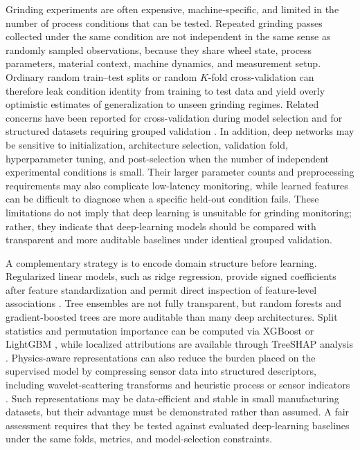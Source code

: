 Grinding experiments are often expensive, machine-specific, and limited in the number of process conditions that can be tested. Repeated grinding passes collected under the same condition are not independent in the same sense as randomly sampled observations, because they share wheel state, process parameters, material context, machine dynamics, and measurement setup. Ordinary random train--test splits or random \(K\)-fold cross-validation can therefore leak condition identity from training to test data and yield overly optimistic estimates of generalization to unseen grinding regimes. Related concerns have been reported for cross-validation during model selection \cite{varma2006bias} and for structured datasets requiring grouped validation \cite{Roberts2017}. In addition, deep networks may be sensitive to initialization, architecture selection, validation fold, hyperparameter tuning, and post-selection when the number of independent experimental conditions is small. Their larger parameter counts and preprocessing requirements may also complicate low-latency monitoring, while learned features can be difficult to diagnose when a specific held-out condition fails. These limitations do not imply that deep learning is unsuitable for grinding monitoring; rather, they indicate that deep-learning models should be compared with transparent and more auditable baselines under identical grouped validation.

A complementary strategy is to encode domain structure before learning. Regularized linear models, such as ridge regression, provide signed coefficients after feature standardization and permit direct inspection of feature-level associations \cite{Hoerl1970}. Tree ensembles are not fully transparent, but random forests \cite{Breiman2001} and gradient-boosted trees \cite{Friedman2001} are more auditable than many deep architectures. Split statistics and permutation importance can be computed via XGBoost \cite{Chen2016} or LightGBM \cite{Ke2017}, while localized attributions are available through TreeSHAP analysis \cite{Lundberg2020}. Physics-aware representations can also reduce the burden placed on the supervised model by compressing sensor data into structured descriptors, including wavelet-scattering transforms \cite{mallat2012group} and heuristic process or sensor indicators \cite{Anden2014}. Such representations may be data-efficient and stable in small manufacturing datasets, but their advantage must be demonstrated rather than assumed. A fair assessment requires that they be tested against evaluated deep-learning baselines under the same folds, metrics, and model-selection constraints.


